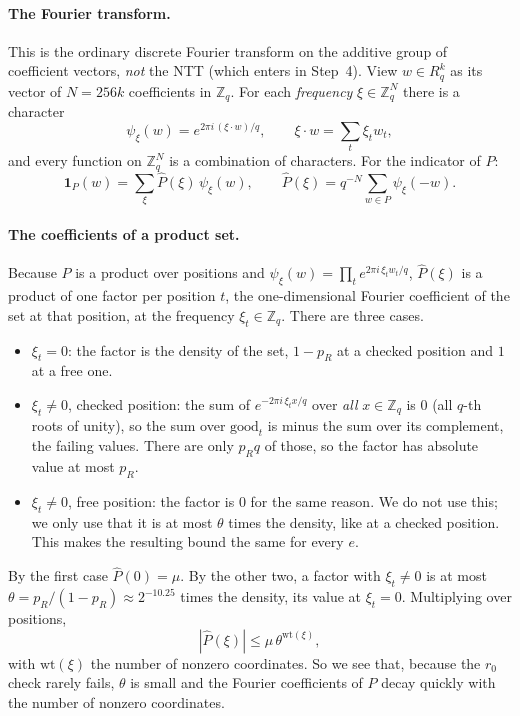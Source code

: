 \documentclass[11pt]{article}
\theoremstyle{definition}
\theoremstyle{remark}
\newcommand{\Zq}{\mathbb{Z}_q}
\newcommand{\Rq}{R_q}
\begin{document}
\paragraph{The Fourier transform.}
This is the ordinary discrete Fourier transform on the additive group of coefficient vectors,
\emph{not} the NTT (which enters in Step~4). View $w\in\Rq^k$ as its vector of $N = 256k$
coefficients in $\Zq$. For each \emph{frequency} $\xi\in\Zq^N$ there is a character
\[
  \psi_\xi(w) = e^{2\pi i\,(\xi\cdot w)/q},\qquad \xi\cdot w = \sum_t \xi_t w_t ,
\]
and every function on $\Zq^N$ is a combination of characters. For the indicator of $P$:
\[
  \mathbf 1_P(w) = \sum_\xi \hat P(\xi)\,\psi_\xi(w),\qquad
  \hat P(\xi) = q^{-N}\sum_{w\in P}\psi_\xi(-w).
\]

\paragraph{The coefficients of a product set.}
Because $P$ is a product over positions and $\psi_\xi(w) = \prod_t e^{2\pi i\,\xi_tw_t/q}$,
$\hat P(\xi)$ is a product of one factor per position $t$, the one-dimensional Fourier coefficient
of the set at that position, at the frequency $\xi_t\in\Zq$. There are three cases.
\begin{itemize}
  \item $\xi_t = 0$: the factor is the density of the set, $1-p_R$ at a checked position and
        $1$ at a free one.
  \item $\xi_t \ne 0$, checked position: the sum of $e^{-2\pi i\,\xi_tx/q}$ over \emph{all}
        $x\in\Zq$ is $0$ (all $q$-th roots of unity), so the sum over $\mathrm{good}_t$ is
        minus the sum over its complement, the failing values. There are only $p_Rq$ of those, so
        the factor has absolute value at most $p_R$.
  \item $\xi_t \ne 0$, free position: the factor is $0$ for the same reason. We do not use
        this; we only use that it is at most $\theta$ times the density, like at a checked
        position. This makes the resulting bound the same for every $e$.
\end{itemize}
By the first case $\hat P(0)=\mu$. By the other two, a factor with $\xi_t\ne0$ is at most
$\theta = p_R/(1-p_R) \approx 2^{-10.25}$ times the density, its value at $\xi_t=0$. Multiplying
over positions,
\[
  |\hat P(\xi)| \le \mu\,\theta^{\mathrm{wt}(\xi)},
\]
with $\mathrm{wt}(\xi)$ the number of nonzero coordinates. So we see that,
because the $r_0$ check rarely fails, $\theta$ is small and the Fourier coefficients of $P$ decay
quickly with the number of nonzero coordinates.
\end{document}
